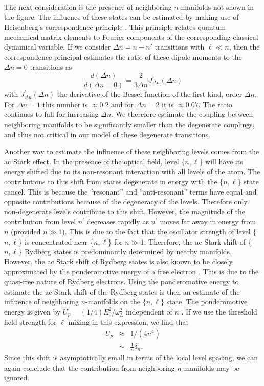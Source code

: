 The next consideration is the presence of neighboring $n$-manifolds not
shown in the figure.  The influence of these states can be estimated by making
use of Heisenberg's correspondence principle \cite{Picart:78}.  This principle
relates quantum mechanical matrix elements to Fourier components of the
corresponding classical dynamical variable.  If we consider $\Delta n = n -
n'$ transitions with $\ell \ll n$, then the correspondence principal estimates
the ratio of these dipole moments to the $\Delta n = 0$ transitions as
\begin{equation}
\frac{d(\Delta n)}{d(\Delta n = 0)} = \frac{2}{3 \Delta n} J_{\Delta
n}^{'}(\Delta n)
\end{equation}
with $J_{\Delta n}^{'}(\Delta n)$ the derivative of the Bessel function of the
first kind, order $\Delta n$.  For $\Delta n = 1$ this number is $\approx 0.2$
and for $\Delta n = 2$ it is $\approx 0.07$.  The ratio continues to fall for
increasing $\Delta n$.  We therefore estimate the coupling between
neighboring manifolds to be significantly smaller than the degenerate
couplings, and thus not critical in our model of these degenerate
transitions.

Another way to estimate the influence of these neighboring levels comes from
the ac Stark effect.  In the presence of the optical field, level
\{$n,\ell$\} will have its energy shifted due to its non-resonant
interaction with all levels of the atom.  The contributions to this shift
from states degenerate in energy with the \{$n,\ell$\} state cancel.  This
is because the ``resonant'' and ``anti-resonant'' terms have equal and opposite
contributions because of the degeneracy of the levels.  Therefore only
non-degenerate levels contribute to this shift.  However, the magnitude of
the contribution from level $n^{'}$ decreases rapidly as $n^{'}$ moves far
away in energy from $n$ (provided $n \gg 1$).  This is due to the fact that
the oscillator strength of level \{$n,\ell$\} is concentrated near
\{$n,\ell$\} for $n \gg 1$.  Therefore, the ac Stark shift of
\{$n,\ell$\} Rydberg states is predominantly determined by nearby manifolds. 
However, the ac Stark shift of Rydberg states is also known to be closely
approximated by the ponderomotive energy of a free electron
\cite{Avan:76,Obrian:94}.  This is due to the quasi-free nature of Rydberg
electrons.  Using the ponderomotive energy to estimate the ac Stark shift of
the Rydberg states is then an estimate of the influence of neighboring
$n$-manifolds on the \{$n,\ell$\} state.  The ponderomotive energy is given
by $ U_p = (1/4)E_0^2/\omega_L^2$ independent of $n$ \cite{Avan:76}.  If we
use the threshold field strength for $\ell$-mixing in this expression, we
find that
\begin{eqnarray}
U_p &\approx & 1/(4n^4)  \\
    & \sim   & \frac{1}{n} \delta_n.
\end{eqnarray}
Since this shift is asymptotically small in terms of the local level spacing,
we can again conclude that the contribution from neighboring $n$-manifolds
may be ignored.

